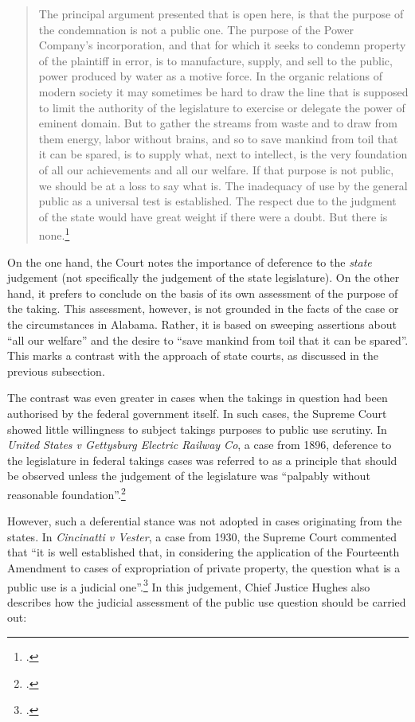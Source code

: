 \begin{quote}The principal argument presented that is open here, is that the purpose of the condemnation is not a public one. The purpose of the Power Company's incorporation, and that for which it seeks to condemn property of the plaintiff in error, is to manufacture, supply, and sell to the public, power produced by water as a motive force. In the organic relations of modern society it may sometimes be hard to draw the line that is supposed to limit the authority of the legislature to exercise or delegate the power of eminent domain. But to gather the streams from waste and to draw from them energy, labor without brains, and so to save mankind from toil that it can be spared, is to supply what, next to intellect, is the very foundation of all our achievements and all our welfare. If that purpose is not public, we should be at a loss to say what is. The inadequacy of use by the general public as a universal test is established. The respect due to the judgment of the state would have great weight if there were a doubt. But there is none.\footcite[32]{vernon16}
\end{quote}

On the one hand, the Court notes the importance of deference to the {\it state} judgement (not specifically the judgement of the state legislature). On the other hand, it prefers to conclude on the basis of its own assessment of the purpose of the taking. This assessment, however, is not grounded in the facts of the case or the circumstances in Alabama. Rather, it is based on sweeping assertions about ``all our welfare'' and the desire to ``save mankind from toil that it can be spared''. This marks a contrast with the approach of state courts, as discussed in the previous subsection.

The contrast was even greater in cases when the takings in question had been authorised by the federal government itself. In such cases, the Supreme Court showed little willingness to subject takings purposes to public use scrutiny. In {\it United States v Gettysburg Electric Railway Co}, a case from 1896, deference to the legislature in federal takings cases was referred to as a principle that should be observed unless the judgement of the legislature was ``palpably without reasonable foundation''.\footcite[680]{gettysburg96} 

However, such a deferential stance was not adopted in cases originating from the states. In {\it Cincinatti v Vester}, a case from 1930, the Supreme Court commented that ``it is well established that, in considering the application of the Fourteenth Amendment to cases of expropriation of private property, the question what is a public use is a judicial one''.\footcite[447]{vester30} In this judgement, Chief Justice Hughes also describes how the judicial assessment of the public use question should be carried out:

